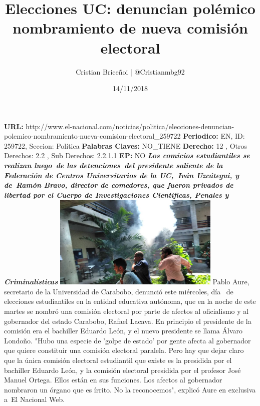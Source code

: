 \documentclass{article}%
\title{\textbf{Elecciones UC: denuncian polémico nombramiento de nueva comisión electoral}}%
\author{Cristian Briceñoi | @Cristianmbg92}%
\date{14/11/2018}%
\begin{document}
%
\normalsize%
\maketitle%
\textbf{URL: }%
http://www.el{-}nacional.com/noticias/politica/elecciones{-}denuncian{-}polemico{-}nombramiento{-}nueva{-}comision{-}electoral\_259722\newline%
%
\textbf{Periodico: }%
EN, %
ID: %
259722, %
Seccion: %
Política\newline%
%
\textbf{Palabras Claves: }%
NO\_TIENE\newline%
%
\textbf{Derecho: }%
12%
, Otros Derechos: %
2.2%
, Sub Derechos: %
2.2.1.1%
\newline%
%
\textbf{EP: }%
NO\newline%
\newline%
%
\textbf{\textit{Los comicios estudiantiles se realizan luego~de las detenciones~del presidente saliente de la Federación de Centros Universitarios de la UC,~Iván Uzcátegui, y de~Ramón Bravo, director de comedores, que fueron privados de libertad por el Cuerpo de Investigaciones Científicas, Penales y Criminalísticas}}%
\newline%
\newline%
%
\includegraphics[width=300px]{166.jpg}%
\newline%
%
Pablo Aure, secretario de la Universidad de Carabobo, denunció este miércoles, día~ de elecciones estudiantiles en la entidad educativa autónoma, que en la noche de este martes se nombró una comisión electoral por parte de afectos al oficialismo y al gobernador del estado Carabobo, Rafael Lacava.%
\newline%
%
En principio el presidente de la comisión era el bachiller Eduardo León, y el nuevo presidente se llama Álvaro Londoño.%
\newline%
%
"Hubo una especie de 'golpe de estado' por gente afecta al gobernador que quiere constituir una comisión electoral paralela. Pero hay que dejar claro que la única comisión electoral estudiantil que existe es la presidida por el bachiller Eduardo León, y la comisión electoral presidida por el profesor José Manuel Ortega. Ellos están en sus funciones. Los afectos al gobernador nombraron un órgano que es írrito. No la reconocemos", explicó Aure en exclusiva a~El Nacional Web.%
\end{document}
